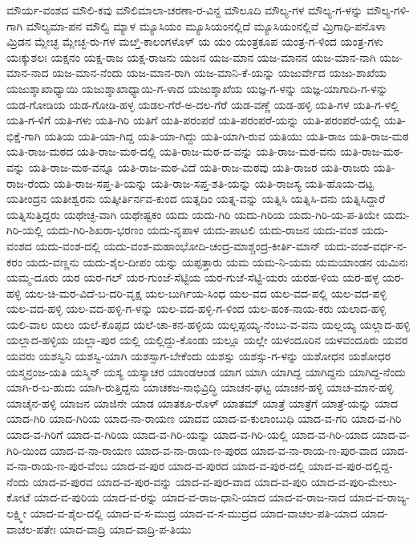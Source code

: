 ಮೌರ್ಯ-ವಂಶದ
ಮೌಲಿ-ಕವು
ಮೌಲಿಮಾಲಾ-ಚರಣಾ-ರ-ವಿನ್ದ
ಮೌಲೂದಿ
ಮೌಲ್ಯ-ಗಳ
ಮೌಲ್ಯ-ಗ-ಳನ್ನು
ಮೌಲ್ಯ-ಗಳಿ-ಗಾಗಿ
ಮೌಲ್ಯಮಾ-ಪನ
ಮೌಲ್ವಿ
ಮ್ಯಾಳ
ಮ್ಯೂಸಿಯಂ
ಮ್ಯೂಸಿಯಂನಲ್ಲಿದೆ
ಮ್ಯೂಸಿಯಂನಲ್ಲಿವೆ
ಮ್ರಿಗಾಧಿ-ಪನೊಳಾ
ಮ್ರಿಡನ
ಮ್ಲೇಚ್ಛ
ಮ್ಲೇಚ್ಛ-ರು-ಗಳ
ಮೞ್ತಿ-ಕಾಲಂಗಳೊಳ್
ಯ
ಯಂ
ಯಂತ್ರಕೂಪ
ಯಂತ್ರ-ಗ-ಳಿಂದ
ಯಂತ್ರ-ಗಳು
ಯಃಕ್ಕುಶಲಃ
ಯಕ್ಷನಂ
ಯಕ್ಷ-ರಾಜ
ಯಕ್ಷ-ರಾಜನು
ಯಜನ
ಯಜ-ಮಾನ
ಯಜ-ಮಾನನ
ಯಜ-ಮಾನ-ನಾಗಿ
ಯಜ-ಮಾನ-ನಾದ
ಯಜ-ಮಾನ-ನೆಂದು
ಯಜ-ಮಾನ-ರಾಗಿ
ಯಜ-ಮಾನಿ-ಕೆ-ಯನ್ನು
ಯಜುರ್ವೇದ
ಯಜು-ಶಾಖೆಯ
ಯಜುಶ್ಶಾಖಾಧ್ಯಾಯಿ
ಯಜುಶ್ಶಾಖಾಧ್ಯಾಯಿ-ಗ-ಳಾದ
ಯಜುಶ್ಶಾಖೆಯ
ಯಜ್ಞ-ಗ-ಳನ್ನು
ಯಜ್ಞ-ಯಾಗಾದಿ-ಗ-ಳನ್ನು
ಯಡ-ಗೋಡಿಯ
ಯಡ-ಗೋಡಿ-ಹಳ್ಳ
ಯಡಲ-ಗೆರೆ-ಅ-ದಲ-ಗೆರೆ
ಯಡ-ವಣ್ಣೆ
ಯಡ-ಹಳ್ಳಿ
ಯತಿ-ಗಳ
ಯತಿ-ಗ-ಳಲ್ಲಿ
ಯತಿ-ಗ-ಳಿಗೆ
ಯತಿ-ಗಳು
ಯತಿ-ಗಿರಿ
ಯತಿಗೆ
ಯತಿ-ಪರಂಪರೆ
ಯತಿ-ಪರಂಪರೆ-ಯನ್ನು
ಯತಿ-ಪರಂಪರೆ-ಯಲ್ಲಿ
ಯತಿ-ಭಿಕ್ಷೆ-ಗಾಗಿ
ಯತಿಯ
ಯತಿ-ಯಾ-ಗಿದ್ದ
ಯತಿ-ಯಾ-ಗಿದ್ದು
ಯತಿ-ಯಾಗಿ-ರುವ
ಯತಿಯು
ಯತಿ-ರಾಜ
ಯತಿ-ರಾಜ-ಮಠ
ಯತಿ-ರಾಜ-ಮಠದ
ಯತಿ-ರಾಜ-ಮಠ-ದಲ್ಲಿ
ಯತಿ-ರಾಜ-ಮಠ-ದ-ವನ್ನು
ಯತಿ-ರಾಜ-ಮಠ-ವನು
ಯತಿ-ರಾಜ-ಮಠ-ವನ್ನು
ಯತಿ-ರಾಜ-ಮಠ-ವನ್ನೂ
ಯತಿ-ರಾಜ-ಮಠ-ವಿದೆ
ಯತಿ-ರಾಜ-ಮಠವು
ಯತಿ-ರಾಜರ
ಯತಿ-ರಾಜರು
ಯತಿ-ರಾಜ-ರೆಂದು
ಯತಿ-ರಾಜ-ಸಪ್ತ-ತಿ-ಯನ್ನು
ಯತಿ-ರಾಜ-ಸಪ್ತ-ಶತಿ-ಯನ್ನು
ಯತಿ-ರಾಜಸ್ಯ
ಯತಿ-ಹೊಯ-ದಟ್ಟ
ಯತೀಂದ್ರನ
ಯತೀಶ್ವರನು
ಯತ್ಕೀರ್ತಿರ್ನವ-ಕುಂದ
ಯತ್ನದಿಂ
ಯತ್ನ-ವನ್ನು
ಯತ್ನಿಸಿ
ಯತ್ನಿಸಿ-ದನು
ಯತ್ನಿಸಿದ್ದಾರೆ
ಯತ್ನಿಸುತ್ತಿದ್ದರು
ಯಥೇಚ್ಛ-ವಾಗಿ
ಯಥೇಷ್ಟಕಂ
ಯದು
ಯದು-ಗಿರಿ
ಯದು-ಗಿರಿಯ
ಯದು-ಗಿರಿ-ಯ-ಪ-ತಿಯೇ
ಯದು-ಗಿರಿ-ಯಲ್ಲಿ
ಯದು-ಗಿರಿ-ಶಿಖರಾ-ಭರಣಂ
ಯದು-ನೃಪಾಳ
ಯದು-ಪಾಟಲಿ
ಯದು-ರಾಜನ
ಯದು-ವಂಶ
ಯದು-ವಂಶದ
ಯದು-ವಂಶ-ದಲ್ಲಿ
ಯದು-ವಂಶ-ಮಹಾಂಭೋದಿ-ಚಂದ್ರ-ಮಾಶ್ಚಂದ್ರ-ಕೀರ್ತಿ-ಮಾನ್
ಯದು-ವಂಶ-ವರ್ಧ-ನ-ಕರಂ
ಯದು-ವಣ್ಣನು
ಯದು-ಶೈಲ-ದೀಪಂ
ಯನ್ನು
ಯಪ್ಪತ್ತಾರು
ಯಮ
ಯಮ-ನಿ-ಯಮ
ಯಮಯಾಂಡನ
ಯಮಿನಃ
ಯಮ್ಮ-ದೂರು
ಯರ
ಯರ-ಗಲ್
ಯರ-ಗುಂಜೆ-ಸೆಟ್ಟಿಯ
ಯರ-ಗುಜೆ-ಸೆಟ್ಟಿ-ಯರು
ಯರಹ-ಳಿಯ
ಯರ-ಹಳ್ಳ
ಯರ-ಹಳ್ಳಿ
ಯಲ-ಚಿ-ಮರ-ವಿದೆ-ಬ-ದರಿ-ವೃಕ್ಷ
ಯಲ-ಬುರ್ಗಿಯ-ಸಿಂಧ
ಯಲ-ವದ
ಯಲ-ವದ-ಪಲ್ಲಿ
ಯಲ-ವದ-ಪಳ್ಳಿ
ಯಲ-ವದ-ಹಳ್ಳಿ
ಯಲ-ವದ-ಹಳ್ಳಿ-ಗ-ಳನ್ನು
ಯಲ-ವದ-ಹಳ್ಳಿ-ಗ-ಳಿಂದ
ಯಲ-ಹಂಕ-ನಾಯ-ಕರು
ಯಲಾದ-ಹಳ್ಳಿ
ಯಲಿ-ವಾಲ
ಯಲು
ಯಲೆ-ಕೊಪ್ಪದ
ಯಲೆ-ಚಾ-ಕನ-ಹಳ್ಳಿಯ
ಯಲ್ಲಪ್ಪಯ್ಯ-ನೆಂಬು-ವ-ವನು
ಯಲ್ಲಯ್ಯ
ಯಲ್ಲಾದ-ಹಳ್ಳಿ
ಯಲ್ಲಾದ-ಹಳ್ಳಿಯ
ಯಲ್ಲಾ-ಪುರ
ಯಲ್ಲಿ
ಯಲ್ಲಿದ್ದು-ಕೊಂಡು
ಯಲ್ಲೂ
ಯಲ್ಲೇ
ಯಳಂದೂರಿನ
ಯಳವಂದೂರು
ಯವರ
ಯವರು
ಯಶಸ್ವಿನಿ
ಯಶಸ್ವಿ-ಯಾಗಿ
ಯಶಸ್ಸಾಗ-ಬೇಕೆಂದು
ಯಶಸ್ಸು
ಯಶಸ್ಸು-ಗ-ಳನ್ನು
ಯಶೋಧನ
ಯಶೋಧರ
ಯಸ್ಮನ್ರಂಜ-ಯತಿ
ಯಸ್ಮಿನ್
ಯಸ್ಯ
ಯಸ್ಯಾಚರ
ಯಾಂಡಆಂಡ
ಯಾಗ
ಯಾಗಿ
ಯಾಗಿದ್ದ
ಯಾಗಿದ್ದನು
ಯಾಗಿದ್ದ-ನೆಂದು
ಯಾಗಿ-ರ-ಬ-ಹುದು
ಯಾಗಿ-ರುತ್ತಿದ್ದನು
ಯಾಚಕಜ-ನಾಭಿವ್ರಿದ್ಧಿ
ಯಾಚನ-ಘಟ್ಟ
ಯಾಚನ-ಹಳ್ಳಿ
ಯಾಚ-ಮಾನ-ಹಳ್ಳಿ
ಯಾಚೈನ-ಹಳ್ಳಿ
ಯಾಜನ
ಯಾಜಿನೇ
ಯಾಡ
ಯಾತಕೂ-ರೊಳ್
ಯಾತಮ್
ಯಾತ್ರೆ
ಯಾತ್ರೆಗೆ
ಯಾತ್ರೆ-ಯನ್ನು
ಯಾದ
ಯಾದ-ಗಿರಿ
ಯಾದ-ಗಿರಿಯ
ಯಾದ-ನಾ-ರಾಯಣ
ಯಾದವ
ಯಾದ-ವ-ಕುಲಾಂಬುಧಿ
ಯಾದ-ವ-ಗರಿ
ಯಾದ-ವ-ಗಿರಿ
ಯಾದ-ವ-ಗಿರಿಗೆ
ಯಾದ-ವ-ಗಿರಿಯ
ಯಾದ-ವ-ಗಿರಿ-ಯನ್ನು
ಯಾದ-ವ-ಗಿರಿ-ಯಲ್ಲಿ
ಯಾದ-ವ-ಗಿರಿ-ಯಾದ
ಯಾದ-ವ-ಗಿರಿ-ಯಿಂದ
ಯಾದ-ವ-ನಾ-ರಾಯಣ
ಯಾದ-ವ-ನಾ-ರಾಯ-ಣ-ಪುರದ
ಯಾದ-ವ-ನಾ-ರಾಯ-ಣ-ಪುರ-ವಾದ
ಯಾದ-ವ-ನಾ-ರಾಯ-ಣ-ಪುರ-ವೆಂಬ
ಯಾದ-ವ-ಪುರ
ಯಾದ-ವ-ಪುರದ
ಯಾದ-ವ-ಪುರ-ದಲ್ಲಿ
ಯಾದ-ವ-ಪುರ-ದಲ್ಲಿದ್ದ-ನೆಂದು
ಯಾದ-ವ-ಪುರವ
ಯಾದ-ವ-ಪುರ-ವನ್ನು
ಯಾದ-ವ-ಪುರ-ವಾದ
ಯಾದ-ವ-ಪುರಿ
ಯಾದ-ವ-ಪುರಿ-ಮೇಲು-ಕೋಟೆ
ಯಾದ-ವ-ಪುರಿಯ
ಯಾದ-ವ-ರನ್ನು
ಯಾದ-ವ-ರಾಜ-ಧಾನಿ-ಯಾದ
ಯಾದ-ವ-ರಾಜ-ನಾದ
ಯಾದ-ವ-ರಾಜ್ಯ-ಲಕ್ಷ್ಮೀ
ಯಾದ-ವ-ಶೈಲ-ದಲ್ಲಿ
ಯಾದ-ವ-ಸ-ಮುದ್ರ
ಯಾದ-ವ-ಸ-ಮುದ್ರದ
ಯಾದ-ವಾಚಲ-ಪತಿ-ಯಾದ
ಯಾದ-ವಾಚಲ-ಪತೇಃ
ಯಾದ-ವಾದ್ರಿ
ಯಾದ-ವಾದ್ರಿ-ಪ-ತಿಯು
